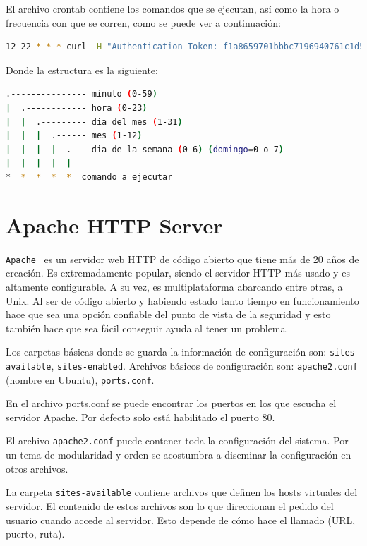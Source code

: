 El archivo crontab contiene los comandos que se ejecutan, así como la hora o frecuencia con que se corren, como se puede ver a continuación:

\begin{lstlisting}[language=bash]
12 22 * * * curl -H "Authentication-Token: f1a8659701bbbc7196940761c1d55c3b9a25fb6569a863df"  -X POST -d '{"state":"0","device_id":"12395613"}' http://localhost:5000/set_led_state
\end{lstlisting}

Donde la estructura es la siguiente:

\begin{lstlisting}[language=bash]
.--------------- minuto (0-59) 
|  .------------ hora (0-23)
|  |  .--------- dia del mes (1-31)
|  |  |  .------ mes (1-12) 
|  |  |  |  .--- dia de la semana (0-6) (domingo=0 o 7) 
|  |  |  |  |
*  *  *  *  *  comando a ejecutar
\end{lstlisting}

\section{Apache HTTP Server}

\lstinline[columns=fixed]{Apache}~\cite{Apache} es un servidor web HTTP de código abierto que tiene más de 20 años de creación. Es extremadamente popular, siendo el servidor HTTP más usado y es altamente configurable.  A su vez, es multiplataforma abarcando entre otras, a Unix. Al ser de código abierto y habiendo estado tanto tiempo en funcionamiento hace que sea una opción confiable del punto de vista de la seguridad y esto también hace que sea fácil conseguir ayuda al tener un problema.

Los carpetas básicas donde se guarda la información de configuración son: \lstinline[columns=fixed]{sites-available}, \lstinline[columns=fixed]{sites-enabled}. Archivos básicos de configuración son: \lstinline[columns=fixed]{apache2.conf}  (nombre en Ubuntu), \lstinline[columns=fixed]{ports.conf}.

En el archivo ports.conf se puede encontrar los puertos en los que escucha el servidor Apache. Por defecto solo está habilitado el puerto 80. 

El archivo \lstinline[columns=fixed]{apache2.conf} puede contener toda la configuración del sistema. Por un tema de modularidad y orden se acostumbra a diseminar la configuración en otros archivos.

La carpeta \lstinline[columns=fixed]{sites-available} contiene archivos que definen los hosts virtuales del servidor. El  contenido de estos archivos son lo que direccionan el pedido del usuario cuando accede al servidor. Esto depende de cómo hace el llamado (URL, puerto, ruta). 

